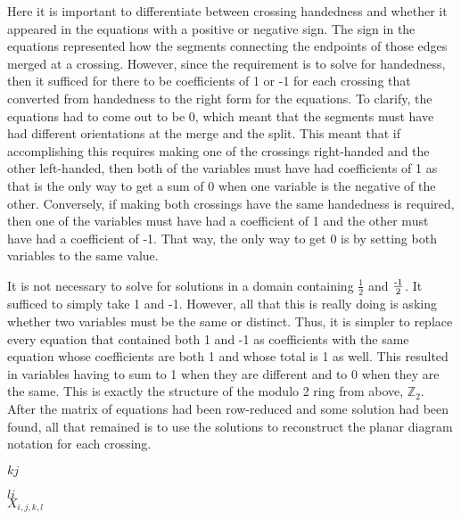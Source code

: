 \begin{paper}
{Here it is important to differentiate between crossing handedness and whether it
appeared in the equations with a positive or negative sign.
The sign in the equations represented how the segments connecting the endpoints
of those edges merged at a crossing.
However, since the requirement is to solve for handedness, then it sufficed for
there to be coefficients of 1 or -1 for each crossing that converted from
handedness to the right form for the equations.
To clarify, the equations had to come out to be 0, which meant that the segments
must have had different orientations at the merge and the split.
This meant that if accomplishing this requires making one of the crossings
right-handed and the other left-handed, then both of the variables must have had
coefficients of 1 as that is the only way to get a sum of 0 when one variable
is the negative of the other.
Conversely, if making both crossings have the same handedness is required, then
one of the variables must have had a coefficient of 1 and the other must have
had a coefficient of -1.
That way, the only way to get 0 is by setting both variables to the same value.

It is not necessary to solve for solutions in a domain containing $\frac12$ and
$\frac{\text-1}2$.
It sufficed to simply take 1 and -1.
However, all that this is really doing is asking whether two variables must be
the same or distinct.
Thus, it is simpler to replace every equation that contained both 1 and -1 as
coefficients with the same equation whose coefficients are both 1 and whose
total is 1 as well.
This resulted in variables having to sum to 1 when they are different and to 0
when they are the same.
This is exactly the structure of the modulo 2 ring from above, $\mathbb{Z}_2$.
After the matrix of equations had been row-reduced and some solution had been
found, all that remained is to use the solutions to reconstruct the planar
diagram notation for each crossing.}

\hspace{0.175\columnwidth}$k$\hspace{0.4\columnwidth}$j$
\begin{center}\end{center}

\hspace{0.175\columnwidth}$l$\hspace{0.4\columnwidth}$i$\\

\hspace{0.33\columnwidth}$X_{i,j,k,l}$\\


\end{paper}
